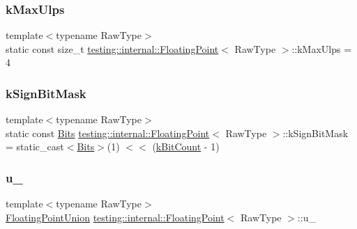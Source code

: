 \subsubsection{\texorpdfstring{kMaxUlps}{kMaxUlps}}
{\footnotesize\ttfamily template$<$typename Raw\+Type$>$ \\
static const size\+\_\+t \mbox{\hyperlink{classtesting_1_1internal_1_1_floating_point}{testing\+::internal\+::\+Floating\+Point}}$<$ Raw\+Type $>$\+::k\+Max\+Ulps = 4\hspace{0.3cm}{\ttfamily [static]}}

\mbox{\label{classtesting_1_1internal_1_1_floating_point_abf87d32d03b1b7e7237e72e3ab1dd830}} 
\subsubsection{\texorpdfstring{kSignBitMask}{kSignBitMask}}
{\footnotesize\ttfamily template$<$typename Raw\+Type$>$ \\
static const \mbox{\hyperlink{classtesting_1_1internal_1_1_floating_point_abf228bf6cd48f12c8b44c85b4971a731}{Bits}} \mbox{\hyperlink{classtesting_1_1internal_1_1_floating_point}{testing\+::internal\+::\+Floating\+Point}}$<$ Raw\+Type $>$\+::k\+Sign\+Bit\+Mask = static\+\_\+cast$<$\mbox{\hyperlink{classtesting_1_1internal_1_1_floating_point_abf228bf6cd48f12c8b44c85b4971a731}{Bits}}$>$(1) $<$$<$ (\mbox{\hyperlink{classtesting_1_1internal_1_1_floating_point_ad730b49e322aec20c46ebf017a106afc}{k\+Bit\+Count}} -\/ 1)\hspace{0.3cm}{\ttfamily [static]}}

\mbox{\label{classtesting_1_1internal_1_1_floating_point_a2e0b6bd427248b91476f3fca281f7104}} 
\subsubsection{\texorpdfstring{u\_}{u\_}}
{\footnotesize\ttfamily template$<$typename Raw\+Type$>$ \\
\mbox{\hyperlink{uniontesting_1_1internal_1_1_floating_point_1_1_floating_point_union}{Floating\+Point\+Union}} \mbox{\hyperlink{classtesting_1_1internal_1_1_floating_point}{testing\+::internal\+::\+Floating\+Point}}$<$ Raw\+Type $>$\+::u\+\_\+\hspace{0.3cm}{\ttfamily [private]}}



